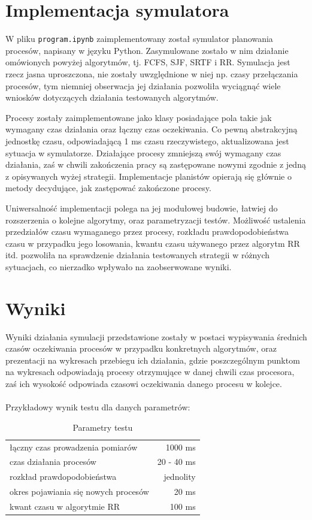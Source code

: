 \documentclass{article}
\begin{document}
\section{Implementacja symulatora}

W pliku \texttt{program.ipynb} zaimplementowany został symulator planowania procesów, napisany w języku Python. Zasymulowane zostało w nim działanie omówionych powyżej algorytmów, tj. FCFS, SJF, SRTF i RR. Symulacja jest rzecz jasna uproszczona, nie zostały uwzględnione w niej np. czasy przełączania procesów, tym niemniej obserwacja jej działania pozwoliła wyciągnąć wiele wniosków dotyczących działania testowanych algorytmów.

Procesy zostały zaimplementowane jako klasy posiadające pola takie jak wymagany czas działania oraz łączny czas oczekiwania. Co pewną abstrakcyjną jednostkę czasu, odpowiadającą 1 ms czasu rzeczywistego, aktualizowana jest sytuacja w symulatorze. Działające procesy zmniejszą swój wymagany czas działania, zaś w chwili zakończenia pracy są zastępowane nowymi zgodnie z jedną z opisywanych wyżej strategii. Implementacje planistów opierają się głównie o metody decydujące, jak zastępować zakończone procesy.

Uniwersalność implementacji polega na jej modułowej budowie, łatwiej do rozszerzenia o kolejne algorytmy, oraz parametryzacji testów. Możliwość ustalenia przedziałów czasu wymaganego przez procesy, rozkładu prawdopodobieństwa czasu w przypadku jego losowania, kwantu czasu używanego przez algorytm RR itd. pozwoliła na sprawdzenie działania testowanych strategii w różnych sytuacjach, co nierzadko wpływało na zaobserwowane wyniki. 

\section{Wyniki}

Wyniki działania symulacji przedstawione zostały w postaci wypisywania średnich czasów oczekiwania procesów w przypadku konkretnych algorytmów, oraz prezentacji na wykresach przebiegu ich działania, gdzie poszczególnym punktom na wykresach odpowiadają procesy otrzymujące w danej chwili czas procesora, zaś ich wysokość odpowiada czasowi oczekiwania danego procesu w kolejce.
\\\\
Przykładowy wynik testu dla danych parametrów:
\\
\begin{table}[h]
    \centering
    \begin{tabular}{|l|r|}
        \hline
        łączny czas prowadzenia pomiarów & 1000 ms \\
        czas działania procesów & 20 - 40 ms \\
        rozkład prawdopodobieństwa & jednolity \\
        okres pojawiania się nowych procesów & 20 ms \\
        kwant czasu w algorytmie RR & 100 ms \\
        \hline
    \end{tabular}
    \caption{Parametry testu}
    \label{tab:test1param}
\end{table}
\end{document}

